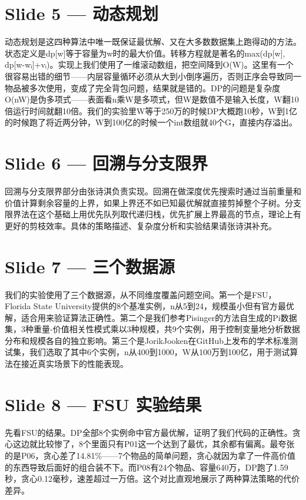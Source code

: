 \documentclass[12pt,a4paper]{ctexart}
\begin{document}
\section*{Slide 5 — 动态规划}

动态规划是这四种算法中唯一既保证最优解、又在大多数数据集上跑得动的方法。状态定义是dp[w]等于容量为w时的最大价值。转移方程就是著名的max(dp[w], dp[w-wᵢ]+vᵢ)。实现上我们使用了一维滚动数组，把空间降到O(W)。这里有一个很容易出错的细节——内层容量循环必须从大到小倒序遍历，否则正序会导致同一物品被多次使用，变成了完全背包问题，结果就是错的。DP的问题是复杂度O(nW)是伪多项式——表面看n乘W是多项式，但W是数值不是输入长度，W翻10倍运行时间就翻10倍。我们的实验里W等于250万的时候DP大概跑10秒，W到1亿的时候跑了将近两分钟，W到100亿的时候一个int数组就40个G，直接内存溢出。

\section*{Slide 6 — 回溯与分支限界}

回溯与分支限界部分由张诗淇负责实现。回溯在做深度优先搜索时通过当前重量和价值计算剩余容量的上界，如果上界还不如已知最优解就直接剪掉整个子树。分支限界法在这个基础上用优先队列取代递归栈，优先扩展上界最高的节点，理论上有更好的剪枝效率。具体的策略描述、复杂度分析和实验结果请张诗淇补充。

\section*{Slide 7 — 三个数据源}

我们的实验使用了三个数据源，从不同维度覆盖问题空间。第一个是FSU，Florida State University提供的8个基准实例，n从5到24，规模虽小但有官方最优解，适合用来验证算法正确性。第二个是我们参考Pisinger的方法自生成的Pi数据集，3种重量-价值相关性模式乘以3种规模，共9个实例，用于控制变量地分析数据分布和规模各自的独立影响。第三个是JorikJooken在GitHub上发布的学术标准测试集，我们选取了其中6个实例，n从400到1000，W从100万到100亿，用于测试算法在接近真实场景下的性能表现。

\section*{Slide 8 — FSU 实验结果}

先看FSU的结果。DP全部8个实例命中官方最优解，证明了我们代码的正确性。贪心这边就比较惨了，8个里面只有P01这一个达到了最优，其余都有偏离。最夸张的是P06，贪心差了14.81\%——7个物品的简单问题，贪心就因为拿了一件高价值的东西导致后面好的组合装不下。而P08有24个物品、容量640万，DP跑了1.59秒，贪心0.12毫秒，速差超过一万倍。这个对比直观地展示了两种算法策略的代价差异。
\end{document}
